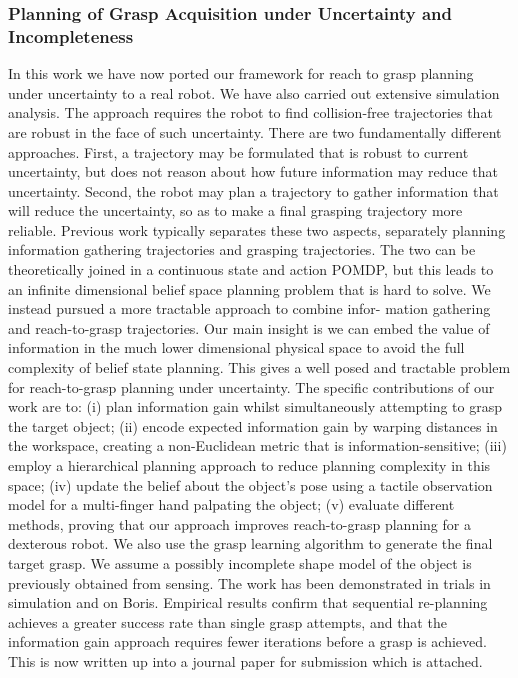 
\subsubsection{Planning of Grasp Acquisition under Uncertainty and Incompleteness}
\label{sec:PlanningUncertainty}

In this work we have now ported our framework for reach to grasp planning under uncertainty to a real robot. We have also carried out extensive simulation analysis. The approach requires the robot to find collision-free trajectories that are robust in the face of such uncertainty. There are two fundamentally different approaches. First, a trajectory may be formulated that is robust to current uncertainty, but does not reason about how future information may reduce that uncertainty. Second, the robot may plan a trajectory to gather information that will reduce the uncertainty, so as to make a final grasping trajectory more reliable. Previous work typically separates these two aspects, separately planning information gathering trajectories and grasping trajectories. The two can be theoretically joined in a continuous state and action POMDP, but this leads to an infinite dimensional belief space planning problem that is hard to solve. We instead pursued a more tractable approach to combine infor- mation gathering and reach-to-grasp trajectories. Our main insight is we can embed the value of information in the much lower dimensional physical space to avoid the full complexity of belief state planning. This gives a well posed and tractable problem for reach-to-grasp planning under uncertainty. The specific contributions of our work are to: (i) plan information gain whilst simultaneously attempting to grasp the target object; (ii) encode expected information gain by warping distances in the workspace, creating a non-Euclidean metric that is information-sensitive; (iii) employ a hierarchical planning approach to reduce planning complexity in this space; (iv) update the belief about the object’s pose using a tactile observation model for a multi-finger hand palpating the object; (v) evaluate different methods, proving that our approach improves reach-to-grasp planning for a dexterous robot. We also use the grasp learning algorithm to generate the final target grasp. We assume a possibly incomplete shape model of the object is previously obtained from sensing. The work has been demonstrated in trials in simulation and on Boris. Empirical results confirm that sequential re-planning achieves a greater success rate than single grasp attempts, and that the information gain approach requires fewer iterations before a grasp is achieved. This is now written up into a journal paper for submission which is attached.

